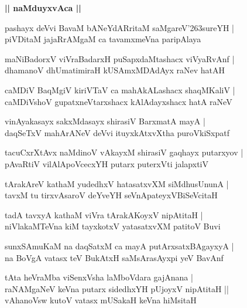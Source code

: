 \documentclass[twoside,12pt,openright]{book}
\def\S{\char'263}
\newcounter{shloka}[chapter]
\def\uvaca#1{\centerline{{\large\textbf{#1}}}}
\begin{document}
\uvaca{|| naMduyxvAca ||}

\begin{shloka}%
pashayx deVvi BavaM bANeYdARritaM saMgareV\S sureYH |\\
piVDitaM jajaRrAMgaM ca tavamxmeVna paripAlaya
\end{shloka}

\begin{shloka}%
maNiBadorxV viVraBadarxH puSapxdaMtashacx viVyaRvAnf |\\
dhamanoV dhUmatimiraH kUSAmxMDAdAyx raNev hatAH 
\end{shloka}

\begin{shloka}%
caMDiV BaqMgiV kiriVTaV ca mahAkALashacx shaqMKaliV |\\
caMDiVshoV gupatxneVtarxshacx kAlAdayxshacx hatA raNeV 
\end{shloka}

\begin{shloka}%
vinAyakasayx sakxMdasayx shirasiV BarxmatA mayA |\\
daqSeTxV mahArANeV deVvi ituyxkAtxvXtha puroVkiSxpatf
\end{shloka}

\begin{shloka}%
tacuCxrXtAvx naMdinoV vAkayxM shirasiV gaqhayx putarxyov |\\
pAvaRtiV vilAlApoVcecxYH putarx puterxVti jalapxtiV 
\end{shloka}

\begin{shloka}%
tArakAreV kathaM yudedhxV hatasatxvXM siMdhusUnunA |\\
tavxM tu tirxvAsaroV deYveYH seVnApateyxVBiSeVcitaH
\end{shloka}

\begin{shloka}%
tadA tavxyA kathaM viVra tArakAKoyxV nipAtitaH |\\
niVlakaMTeVna kiM tayxkotxV yatasatxvXM patitoV Buvi
\end{shloka}

\begin{shloka}%
sunxSAmuKaM na daqSatxM ca mayA putArxsatxBAgayxyA |\\
na BoVgA vatasx teV BukAtxH saMsArasAyxpi yeV BavAnf 
\end{shloka}

\begin{shloka}%
tAta heVraMba viSenxVsha laMboVdara gajAnana |\\
raNAMgaNeV keVna putarx sidedhxYH pUjoyxV nipAtitaH ||\\
vAhanoVsw kutoV vatasx mUSakaH keVna hiMsitaH 
\end{shloka}
\end{document}
